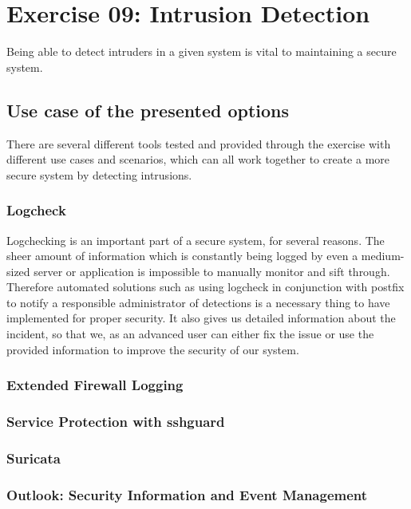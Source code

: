 \section{Exercise 09: Intrusion Detection}
Being able to detect intruders in a given system is vital to maintaining a secure system.
\subsection{Use case of the presented options}
There are several different tools tested and provided through the exercise with different use cases and scenarios, which can all work together to create a more secure system by detecting intrusions.
\subsubsection{Logcheck}
Logchecking is an important part of a secure system, for several reasons. The sheer amount of information which is constantly being logged by even a medium-sized server or application is impossible to manually monitor and sift through. Therefore automated solutions such as using logcheck in conjunction with postfix to notify a responsible administrator of detections is a necessary thing to have implemented for proper security. It also gives us detailed information about the incident, so that we, as an advanced user can either fix the issue or use the provided information to improve the security of our system.

\subsubsection{Extended Firewall Logging}


\subsubsection{Service Protection with sshguard}


\subsubsection{Suricata}


\subsubsection{Outlook: Security Information and Event Management}
